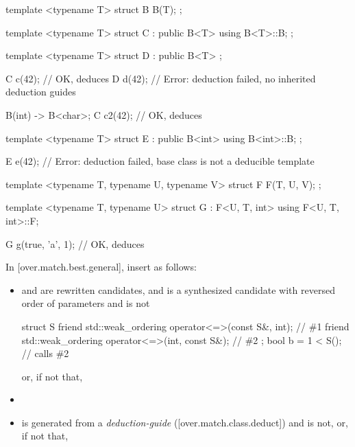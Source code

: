 \begin{adjustwidth}{0.5cm}{0.5cm}
\begin{addedblock}
\begin{example}
\begin{codeblock}
template <typename T> struct B {
  B(T);
};

template <typename T> struct C : public B<T> {
  using B<T>::B;
};

template <typename T> struct D : public B<T> {};

C c(42);  // OK, deduces 
D d(42);  // Error: deduction failed, no inherited deduction guides

B(int) -> B<char>;
C c2(42); // OK, deduces 

template <typename T> struct E : public B<int> {
  using B<int>::B;
};

E e(42);  // Error: deduction failed, base class is not a deducible template

template <typename T, typename U, typename V> struct F {
  F(T, U, V);
};

template <typename T, typename U> struct G : F<U, T, int> {
  using F<U, T, int>::F;
}

G g(true, 'a', 1); // OK, deduces 

\end{codeblock}
\end{example}
\end{addedblock}
\end{adjustwidth}

In [over.match.best.general], insert as follows:

\begin{adjustwidth}{0cm}{0.5cm}
\begin{itemize}
\item
{} and  are rewritten candidates, and
 is a synthesized candidate
with reversed order of parameters
and  is not
\begin{example}
\begin{codeblock}
struct S {
  friend std::weak_ordering operator<=>(const S&, int);         // \#1
  friend std::weak_ordering operator<=>(int, const S&);         // \#2
};
bool b = 1 < S();                                               // calls \#2
\end{codeblock}
\end{example}
or, if not that,


\item {}

\item
{} is generated from a
\emph{deduction-guide} ([over.match.class.deduct])
and  is not, or, if not that,
\end{itemize}
\end{adjustwidth}

